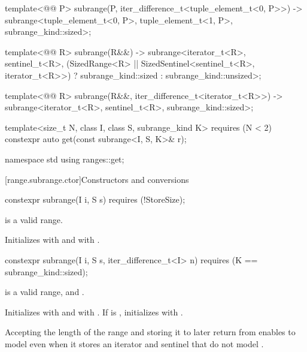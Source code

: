 \begin{codeblock}
{  template<@@ P>
    subrange(P, iter_difference_t<tuple_element_t<0, P>>) ->
      subrange<tuple_element_t<0, P>, tuple_element_t<1, P>, subrange_kind::sized>;

  template<@@ R>
    subrange(R&&) ->
      subrange<iterator_t<R>, sentinel_t<R>,
               (SizedRange<R> || SizedSentinel<sentinel_t<R>, iterator_t<R>>)
                 ? subrange_kind::sized : subrange_kind::unsized>;

  template<@@ R>
    subrange(R&&, iter_difference_t<iterator_t<R>>) ->
      subrange<iterator_t<R>, sentinel_t<R>, subrange_kind::sized>;

  template<size_t N, class I, class S, subrange_kind K>
    requires (N < 2)
  constexpr auto get(const subrange<I, S, K>& r);
}

namespace std {
  using ranges::get;
}
\end{codeblock}

[range.subrange.ctor]{Constructors and conversions}

%
\begin{itemdecl}
constexpr subrange(I i, S s) requires (!StoreSize);
\end{itemdecl}

\begin{itemdescr}
\pnum
\expects {} is a valid range.

\pnum
\effects Initializes  with  and  with
.
\end{itemdescr}

%
\begin{itemdecl}
constexpr subrange(I i, S s, iter_difference_t<I> n)
  requires (K == subrange_kind::sized);
\end{itemdecl}

\begin{itemdescr}
\pnum
\expects {} is a valid range, and
.

\pnum
\effects Initializes  with  and  with
. If  is , initializes  with
.

\pnum
\begin{note}
Accepting the length of the range and storing it to later return  from
 enables  to model  even
when it stores an iterator and sentinel that do not model
.
\end{note}
\end{itemdescr}

